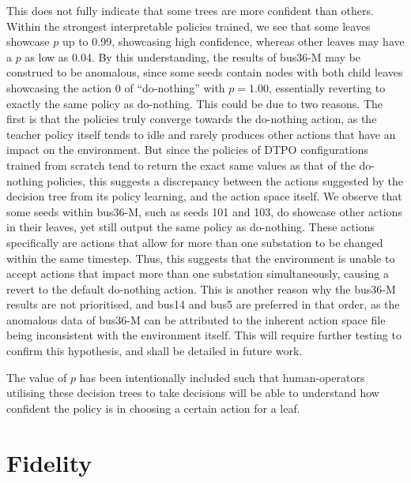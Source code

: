 This does not fully indicate that some trees are more confident than others. Within the strongest interpretable policies trained, we see that some leaves showcase $p$ up to 0.99, showcasing high confidence, whereas other leaves may have a $p$ as low as 0.04. By this understanding, the results of bus36-M may be construed to be anomalous, since some seeds contain nodes with both child leaves showcasing the action 0 of ``do-nothing'' with $p = 1.00$, essentially reverting to exactly the same policy as do-nothing. This could be due to two reasons. The first is that the policies truly converge towards the do-nothing action, as the teacher policy itself tends to idle and rarely produces other actions that have an impact on the environment. But since the policies of DTPO configurations trained from scratch tend to return the exact same values as that of the do-nothing policies, this suggests a discrepancy between the actions suggested by the decision tree from its policy learning, and the action space itself. We observe that some seeds within bus36-M, such as seeds 101 and 103, do showcase other actions in their leaves, yet still output the same policy as do-nothing. These actions specifically are actions that allow for more than one substation to be changed within the same timestep. Thus, this suggests that the environment is unable to accept actions that impact more than one substation simultaneously, causing a revert to the default do-nothing action. This is another reason why the bus36-M results are not prioritised, and bus14 and bus5 are preferred in that order, as the anomalous data of bus36-M can be attributed to the inherent action space file being inconsistent with the environment itself. This will require further testing to confirm this hypothesis, and shall be detailed in future work. 

The value of $p$ has been intentionally included such that human-operators utilising these decision trees to take decisions will be able to understand how confident the policy is in choosing a certain action for a leaf. 

\section{Fidelity}

